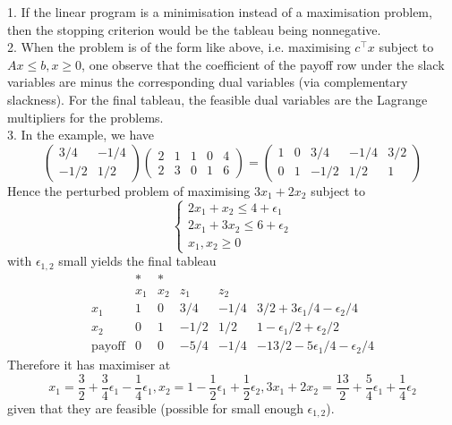 \begin{remark}
    1. If the linear program is a minimisation instead of a maximisation problem, then the stopping criterion would be the tableau being nonnegative.\\
    2. When the problem is of the form like above, i.e. maximising $c^\top x$ subject to $Ax\le b,x\ge 0$, one observe that the coefficient of the payoff row under the slack variables are minus the corresponding dual variables (via complementary slackness).
    For the final tableau, the feasible dual variables are the Lagrange multipliers for the problems.\\
    3. In the example, we have
    $$\begin{pmatrix}
        3/4&-1/4\\
        -1/2&1/2
    \end{pmatrix}\begin{pmatrix}
        2&1&1&0&4\\
        2&3&0&1&6
    \end{pmatrix}=\begin{pmatrix}
        1&0&3/4&-1/4&3/2\\
        0&1&-1/2&1/2&1
    \end{pmatrix}$$
    Hence the perturbed problem of maximising $3x_1+2x_2$ subject to
    $$\begin{cases}
        2x_1+x_2\le 4+\epsilon_1\\
        2x_1+3x_2\le 6+\epsilon_2\\
        x_1,x_2\ge 0
    \end{cases}$$
    with $\epsilon_{1,2}$ small yields the final tableau
    $$\begin{array}{c|cccc|c}
        &\ast&\ast&&&\\
        &x_1&x_2&z_1&z_2&\\ \hline
        x_1&1&0&3/4&-1/4&3/2+3\epsilon_1/4-\epsilon_2/4\\
        x_2&0&1&-1/2&1/2&1-\epsilon_1/2+\epsilon_2/2\\ \hline
        \text{payoff}&0&0&-5/4&-1/4&-13/2-5\epsilon_1/4-\epsilon_2/4
    \end{array}$$
    Therefore it has maximiser at
    $$x_1=\frac{3}{2}+\frac{3}{4}\epsilon_1-\frac{1}{4}\epsilon_1,x_2=1-\frac{1}{2}\epsilon_1+\frac{1}{2}\epsilon_2, 3x_1+2x_2=\frac{13}{2}+\frac{5}{4}\epsilon_1+\frac{1}{4}\epsilon_2$$
    given that they are feasible (possible for small enough $\epsilon_{1,2}$).
\end{remark}
